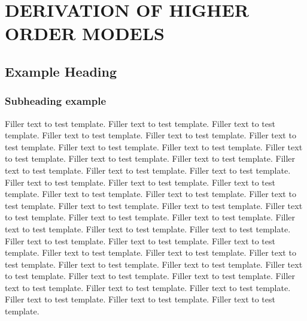 
\chapter{DERIVATION OF HIGHER ORDER MODELS}

\section{Example Heading}

\subsection{Subheading example}

Filler text to test template. Filler text to test template. Filler text to
test template. Filler text to test template. Filler text to test template.
Filler text to test template. Filler text to test template. Filler text to
test template. Filler text to test template. Filler text to test template.
Filler text to test template. Filler text to test template. Filler text to
test template. Filler text to test template. Filler text to test template.
Filler text to test template. Filler text to test template. Filler text to
test template. Filler text to test template. Filler text to test template.
Filler text to test template. Filler text to test template. Filler text to
test template. Filler text to test template. Filler text to test template.
Filler text to test template. Filler text to test template. Filler text to
test template. Filler text to test template. Filler text to test template.
Filler text to test template. Filler text to test template. Filler text to
test template. Filler text to test template. Filler text to test template.
Filler text to test template. Filler text to test template. Filler text to
test template. Filler text to test template. Filler text to test template.
Filler text to test template. Filler text to test template. Filler text to
test template. Filler text to test template. Filler text to test template.

